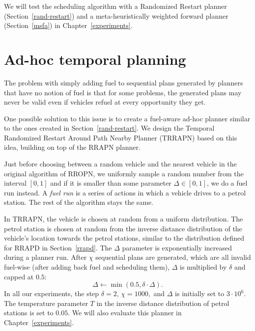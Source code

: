 We will test the scheduling algorithm with a Randomized Restart planner (Section~\ref{rand-restart})
and a meta-heuristically weighted forward planner (Section~\ref{msfa}) in Chapter~\ref{experiments}.



























\section{Ad-hoc temporal planning}\label{temporal-approach}

The problem with simply adding fuel to sequential plans generated
by planners that have no notion of fuel is that
for some problems, the generated plans may never be valid even if
vehicles refuel at every opportunity they get.

One possible solution to this issue is to create a fuel-aware ad-hoc planner
similar to the ones created in Section~\ref{rand-restart}.
We design the Temporal Randomized Restart
Around Path Nearby Planner (TRRAPN) based on this idea,
building on top of the RRAPN planner.

Just before choosing between a random vehicle and the nearest vehicle
in the original algorithm of RROPN, we uniformly sample a random number from the interval $[0,1]$
and if it is smaller than some parameter $\Delta \in [0, 1]$,
we do a fuel run instead. A \textit{fuel run} is a series of actions
in which a vehicle drives to a petrol station.
The rest of the algorithm stays the same.

In TRRAPN, the vehicle is chosen at random from a uniform distribution.
The petrol station is chosen at random from the inverse distance
distribution of the vehicle's location towards the petrol stations,
similar to the distribution defined for RRAPD in Section~\ref{rrapd}.
The $\Delta$ parameter is exponentially increased during
a planner run. After $\chi$ sequential plans are generated, which are all invalid fuel-wise (after adding back fuel and scheduling them), $\Delta$ is multiplied by $\delta$
and capped at $0.5$:
$$\Delta \gets \min(0.5, \delta \cdot \Delta).$$
In all our experiments, the step $\delta = 2$, $\chi = 1000,$
and $\Delta$ is initially set to $3 \cdot 10^{6}$.
The temperature parameter $T$ in the inverse distance distribution of petrol stations is set to $0.05$. We will also evaluate this planner
in Chapter~\ref{experiments}.
